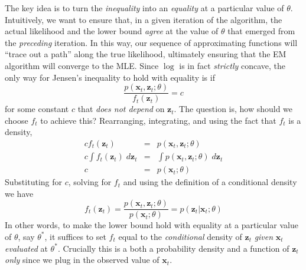 \documentclass[12pt]{article}
\theoremstyle{definition}
\begin{document}
The key idea is to turn the \emph{inequality} into an \emph{equality} at a particular value of $\theta$. Intuitively, we want to ensure that, in a given iteration of the algorithm, the  actual likelihood and the lower bound \emph{agree} at the value of $\theta$ that emerged from the \emph{preceding} iteration. In this way, our sequence of approximating functions will ``trace out a path'' along the true likelihood, ultimately ensuring that the EM algorithm will converge to the MLE. Since $\log$ is in fact \emph{strictly} concave, the only way for Jensen's inequality to hold with equality is if 
$$\frac{p(\textbf{x}_t,\textbf{z}_t;\theta)}{f_t(\mathbf{z}_t)} = c$$
for some constant $c$ that \emph{does not depend} on $\mathbf{z}_t$. The question is, how should we choose $f_t$ to achieve this? Rearranging, integrating, and using the fact that $f_t$ is a density,
	\begin{eqnarray*}
		c f_t(\mathbf{z}_t) &=& p(\mathbf{x}_t, \mathbf{z}_t;\theta)\\
		c \int f_t(\mathbf{z}_t) \; d \mathbf{z}_t &=& \int p(\mathbf{x}_t, \mathbf{z}_t;\theta) \; d \mathbf{z}_t\\
		c &=& p(\mathbf{x}_t;\theta) 
	\end{eqnarray*}
Substituting for $c$, solving for $f_t$ and using the definition of a conditional density we have
	$$f_t(\textbf{z}_t)= \frac{p(\textbf{x}_t,\textbf{z}_t;\theta)}{p(\mathbf{x}_t;\theta)} = p(\textbf{z}_t|\textbf{x}_t;\theta)$$
In other words, to make the lower bound hold with equality at a particular value of $\theta$, say $\theta^*$, it suffices to set $f_t$ equal to the \emph{conditional} density of $\mathbf{z}_t$ \emph{given} $\mathbf{x}_t$ \emph{evaluated} at $\theta^*$. Crucially this is a both a probability density and a function of $\mathbf{z}_t$ \emph{only} since we plug in the observed value of $\mathbf{x}_t$.
\end{document}
